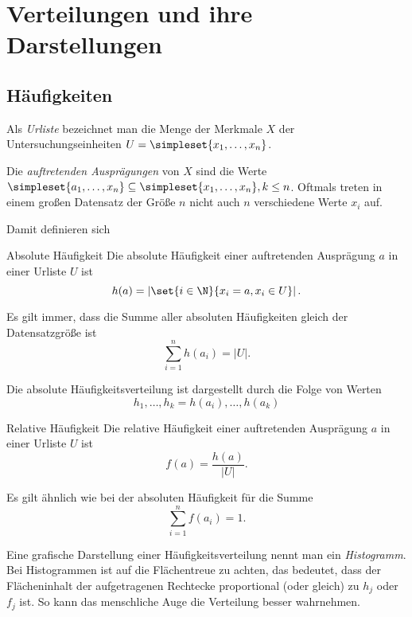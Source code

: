 \chapter{Verteilungen und ihre Darstellungen}
\section{Häufigkeiten}
Als \emph{Urliste} bezeichnet man die Menge der Merkmale $X$ der Untersuchungseinheiten $U=\simpleset{x_1,\ldots,x_n}$.

Die \emph{auftretenden Ausprägungen} von $X$ sind die Werte $\simpleset{a_1,\ldots,x_n}\subseteq\simpleset{x_1,\ldots,x_n}, k\leq n$.
Oftmals treten in einem großen Datensatz der Größe $n$ nicht auch $n$ verschiedene Werte $x_i$ auf.

Damit definieren sich 
\begin{definition}{Absolute Häufigkeit}
	Die absolute Häufigkeit einer auftretenden Ausprägung $a$ in einer Urliste $U$ ist
	\begin{equation*}
		h(a)=\left|\set{i\in\N}{x_i=a, x_i\in U}\right|.
	\end{equation*}
\end{definition}
Es gilt immer, dass die Summe aller absoluten Häufigkeiten gleich der Datensatzgröße ist
\begin{equation*}
	\sum\limits_{i=1}^n h(a_i)=|U|.
\end{equation*}

Die absolute Häufigkeitsverteilung ist dargestellt durch die Folge von Werten
$$h_1,\ldots,h_k=h(a_i),\ldots,h(a_k)$$

\begin{definition}{Relative Häufigkeit}
	Die relative Häufigkeit einer auftretenden Ausprägung $a$ in einer Urliste $U$ ist
	\begin{equation*}
		f(a)=\frac{h(a)}{|U|}.
	\end{equation*}
\end{definition}
Es gilt ähnlich wie bei der absoluten Häufigkeit für die Summe
\begin{equation*}
	\sum\limits_{i=1}^n f(a_i)=1.
\end{equation*}


Eine grafische Darstellung einer Häufigkeitsverteilung nennt man ein \emph{Histogramm}. Bei Histogrammen ist auf die Flächentreue zu achten, das bedeutet, dass der Flächeninhalt der aufgetragenen Rechtecke proportional (oder gleich) zu $h_j$ oder $f_j$ ist. So kann das menschliche Auge die Verteilung besser wahrnehmen.

